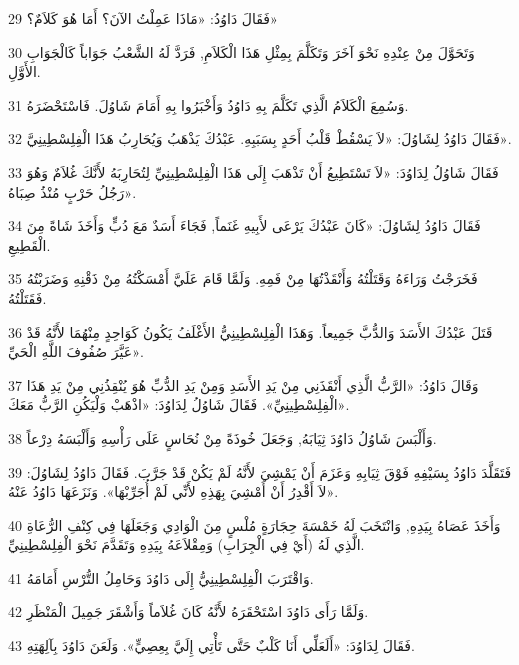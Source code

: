 \par 29 فَقَالَ دَاوُدُ: «مَاذَا عَمِلْتُ الآنَ؟ أَمَا هُوَ كَلاَمٌ؟»
\par 30 وَتَحَوَّلَ مِنْ عِنْدِهِ نَحْوَ آخَرَ وَتَكَلَّمَ بِمِثْلِ هَذَا الْكَلاَمِ, فَرَدَّ لَهُ الشَّعْبُ جَوَاباً كَالْجَوَابِ الأَوَّلِ.
\par 31 وَسُمِعَ الْكَلاَمُ الَّذِي تَكَلَّمَ بِهِ دَاوُدُ وَأَخْبَرُوا بِهِ أَمَامَ شَاوُلَ. فَاسْتَحْضَرَهُ.
\par 32 فَقَالَ دَاوُدُ لِشَاوُلَ: «لاَ يَسْقُطْ قَلْبُ أَحَدٍ بِسَبَبِهِ. عَبْدُكَ يَذْهَبُ وَيُحَارِبُ هَذَا الْفِلِسْطِينِيَّ».
\par 33 فَقَالَ شَاوُلُ لِدَاوُدَ: «لاَ تَسْتَطِيعُ أَنْ تَذْهَبَ إِلَى هَذَا الْفِلِسْطِينِيِّ لِتُحَارِبَهُ لأَنَّكَ غُلاَمٌ وَهُوَ رَجُلُ حَرْبٍ مُنْذُ صِبَاهُ».
\par 34 فَقَالَ دَاوُدُ لِشَاوُلَ: «كَانَ عَبْدُكَ يَرْعَى لأَبِيهِ غَنَماً, فَجَاءَ أَسَدٌ مَعَ دُبٍّ وَأَخَذَ شَاةً مِنَ الْقَطِيعِ.
\par 35 فَخَرَجْتُ وَرَاءَهُ وَقَتَلْتُهُ وَأَنْقَذْتُهَا مِنْ فَمِهِ. وَلَمَّا قَامَ عَلَيَّ أَمْسَكْتُهُ مِنْ ذَقْنِهِ وَضَرَبْتُهُ فَقَتَلْتُهُ.
\par 36 قَتَلَ عَبْدُكَ الأَسَدَ وَالدُّبَّ جَمِيعاً. وَهَذَا الْفِلِسْطِينِيُّ الأَغْلَفُ يَكُونُ كَوَاحِدٍ مِنْهُمَا لأَنَّهُ قَدْ عَيَّرَ صُفُوفَ اللَّهِ الْحَيِّ».
\par 37 وَقَالَ دَاوُدُ: «الرَّبُّ الَّذِي أَنْقَذَنِي مِنْ يَدِ الأَسَدِ وَمِنْ يَدِ الدُّبِّ هُوَ يُنْقِذُنِي مِنْ يَدِ هَذَا الْفِلِسْطِينِيِّ». فَقَالَ شَاوُلُ لِدَاوُدَ: «اذْهَبْ وَلْيَكُنِ الرَّبُّ مَعَكَ».
\par 38 وَأَلْبَسَ شَاوُلُ دَاوُدَ ثِيَابَهُ, وَجَعَلَ خُوذَةً مِنْ نُحَاسٍ عَلَى رَأْسِهِ وَأَلْبَسَهُ دِرْعاً.
\par 39 فَتَقَلَّدَ دَاوُدُ بِسَيْفِهِ فَوْقَ ثِيَابِهِ وَعَزَمَ أَنْ يَمْشِيَ لأَنَّهُ لَمْ يَكُنْ قَدْ جَرَّبَ. فَقَالَ دَاوُدُ لِشَاوُلَ: «لاَ أَقْدِرُ أَنْ أَمْشِيَ بِهَذِهِ لأَنِّي لَمْ أُجَرِّبْهَا». وَنَزَعَهَا دَاوُدُ عَنْهُ.
\par 40 وَأَخَذَ عَصَاهُ بِيَدِهِ, وَانْتَخَبَ لَهُ خَمْسَةَ حِجَارَةٍ مُلْسٍ مِنَ الْوَادِي وَجَعَلَهَا فِي كِنْفِ الرُّعَاةِ الَّذِي لَهُ (أَيْ فِي الْجِرَابِ) وَمِقْلاَعَهُ بِيَدِهِ وَتَقَدَّمَ نَحْوَ الْفِلِسْطِينِيِّ.
\par 41 وَاقْتَرَبَ الْفِلِسْطِينِيُّ إِلَى دَاوُدَ وَحَامِلُ التُّرْسِ أَمَامَهُ.
\par 42 وَلَمَّا رَأَى دَاوُدَ اسْتَحْقَرَهُ لأَنَّهُ كَانَ غُلاَماً وَأَشْقَرَ جَمِيلَ الْمَنْظَرِ.
\par 43 فَقَالَ لِدَاوُدَ: «أَلَعَلِّي أَنَا كَلْبٌ حَتَّى تَأْتِي إِلَيَّ بِعِصِيٍّ». وَلَعَنَ دَاوُدَ بِآلِهَتِهِ.
